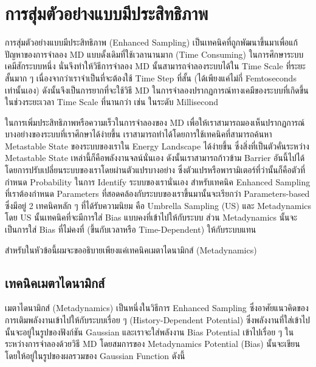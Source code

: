 \section{การสุ่มตัวอย่างแบบมีประสิทธิภาพ}

การสุ่มตัวอย่างแบบมีประสิทธิภาพ (Enhanced Sampling) เป็นเทคนิคที่ถูกพัฒนาขึ้นมาเพื่อแก้ปัญหาของการจำลอง MD แบบดั้งเดิมที่ใช้เวลานานมาก 
(Time Consuming) ในการศึกษาระบบเคมีสักระบบหนึ่ง นั่นจึงทำให้วิธีการจำลอง MD นั้นสามารถจำลองระบบได้ใน Time Scale ที่ระยะสั้นมาก ๆ 
เนื่องจากว่าเราจำเป็นที่จะต้องใช้ Time Step ที่สั้น (ได้เพียงแค่ไม่กี่ Femtoseconds เท่านั้นเอง) ดังนั้นจึงเป็นการยากที่จะใช้วิธี MD 
ในการจำลองปรากฏการณ์ทางเคมีของระบบที่เกิดขึ้นในช่วงระยะเวลา Time Scale ที่นานกว่า เช่น ในระดับ Millisecond 

ในการเพิ่มประสิทธิภาพหรือความเร็วในการจำลองของ MD เพื่อให้เราสามารถมองเห็นปรากฏการณ์บางอย่างของระบบที่เราศึกษาได้ง่ายขึ้น 
เราสามารถทำได้โดยการใช้เทคนิคที่สามารถค้นหา Metastable State ของระบบของเราใน Energy Landscape ได้ง่ายขึ้น ซึ่งสิ่งที่เป็นตัวคั่นระหว่าง 
Metastable State เหล่านี้ก็คือพลังงานจลน์นั่นเอง ดังนั้นเราสามารถก้าวข้าม Barrier อันนี้ไปได้โดยการปรับเปลี่ยนระบบของเราโดยผ่านตัวแปรบางอย่าง 
ซึ่งตัวแปรหรือพารามิเตอร์ที่ว่านั้นก็คือตัวที่กำหนด Probability ในการ Identify ระบบของเรานั่นเอง สำหรับเทคนิค Enhanced Sampling 
ที่เราต้องกำหนด Parameters ที่สอดคล้องกับระบบของเราขึ้นมานั้นจะเรียกว่า Parameters-based ซึ่งมีอยู่ 2 เทคนิคหลัก ๆ ที่ได้รับความนิยม 
คือ Umbrella Sampling (US) และ Metadynamics โดย US นั้นเทคนิคที่จะมีการใส่ Bias แบบคงที่เข้าไปให้กับระบบ ส่วน Metadynamics 
นั้นจะเป็นการใส่ Bias ที่ไม่คงที่ (ขึ้นกับเวลาหรือ Time-Dependent) ให้กับระบบแทน 

สำหรับในหัวข้อนี้ผมจะขออธิบายเพียงแค่เทคนิคเมตาไดนามิกส์ (Metadynamics)

\subsection{เทคนิคเมตาไดนามิกส์}

เมตาไดนามิกส์ (Metadynamics) เป็นหนึ่งในวิธีการ Enhanced Sampling ซึ่งอาศัยแนวคิดของการเติมพลังงานเข้าไปให้กับระบบเรื่อย ๆ
(History-Dependent Potential) ซึ่งพลังงานที่ใส่เข้าไปนั้นจะอยู่ในรูปของฟังก์ชัน Gaussian และเราจะใส่พลังงาน Bias Potential
เข้าไปเรื่อย ๆ ในระหว่างการจำลองด้วยวิธี MD โดยสมการของ Metadynamics Potential (Bias) นั้นจะเขียนโดยให้อยู่ในรูปของผลรวมของ
Gaussian Function ดังนี้


